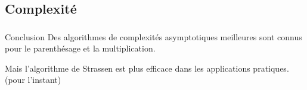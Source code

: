 \documentclass{beamer}
\begin{document}
\subsection{Complexité}
\begin{frame}
  \frametitle{\insertsubsection}
\end{frame}



\begin{frame}{Conclusion}
  Des algorithmes de complexités asymptotiques meilleures
  sont connus pour le parenthésage et la multiplication.

  Mais l'algorithme de Strassen est plus efficace dans les
  applications pratiques. (pour l'instant)
\end{frame}
\end{document}
